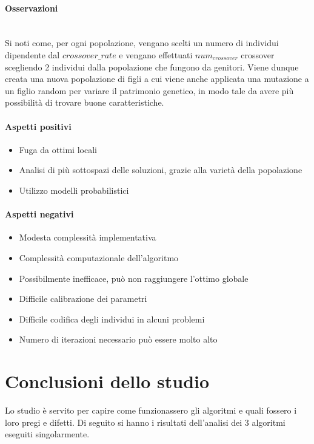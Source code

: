 \noindent \paragraph{Osservazioni}\hfill\\
Si noti come, per ogni popolazione, vengano scelti un numero di individui dipendente dal {$crossover\_rate$}
e vengano effettuati {$num_{crossover}$} crossover scegliendo 2 individui dalla popolazione che fungono da genitori.
Viene dunque creata una nuova popolazione di figli a cui viene anche applicata una mutazione a un figlio random per
variare il patrimonio genetico, in modo tale da avere più possibilità di trovare buone caratteristiche.

\noindent \paragraph{Aspetti positivi}
\begin{itemize}
    \item Fuga da ottimi locali
    \item Analisi di più sottospazi delle soluzioni, grazie alla varietà della popolazione
    \item Utilizzo modelli probabilistici
\end{itemize}

\noindent \paragraph{Aspetti negativi}
\begin{itemize}
    \item Modesta complessità implementativa
    \item Complessità computazionale dell'algoritmo
    \item Possibilmente inefficace, può non raggiungere l'ottimo globale
    \item Difficile calibrazione dei parametri
    \item Difficile codifica degli individui in alcuni problemi
    \item Numero di iterazioni necessario può essere molto alto
\end{itemize}

\section{Conclusioni dello studio}
\noindent Lo studio è servito per capire come funzionassero gli algoritmi e quali fossero i loro pregi e difetti.
Di seguito si hanno i risultati dell'analisi dei 3 algoritmi eseguiti singolarmente.\\

